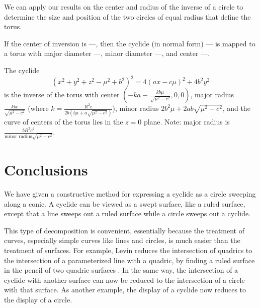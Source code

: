 {{We can apply our results on the center and radius of the inverse of a circle
to determine the size and position of the two circles of equal radius that
define the torus.

\begin{theorem}
\label{thm:twocircles}
If the center of inversion is ---, then the cyclide (in normal form) ---
is mapped to a torus with 
major diameter ---, 
minor diameter ---,
and center ---.
\end{theorem}



\begin{theorem}
The cyclide 
\[ 
(x^{2} + y^{2} + z^{2} - \mu^{2} + b^{2})^{2} = 4(ax - c\mu)^{2} + 4b^{2}y^{2}
\]
is the inverse of the torus
with center $(-ka-\frac{kb\mu}{\sqrt{\mu^{2} - c^{2}}},0,0)$,
major radius $\frac{kbc}{\sqrt{\mu^{2} - c^{2}}}$
(where $k = \frac{R^{2}c}{2b(b\mu + a\sqrt{\mu^{2} - c^{2}})}$),
minor radius $2b^{2}\mu + 2ab\sqrt{\mu^{2} - c^{2}}$,
and the curve of centers of the torus lies in the $z = 0$ plane.
Note: major radius is $\frac{bR^{2}c^{2}}
			    {\mbox{minor radius}\sqrt{\mu^{2}-c^{2}}}$.
\end{theorem}
}





\section{Conclusions}
\label{sec-con}

We have given a constructive method for expressing a cyclide
as a circle sweeping along a conic.
A cyclide can be viewed as a swept surface,
like a ruled surface, except that a line sweeps out a ruled surface
while a circle sweeps out a cyclide.

This type of decomposition is convenient, essentially because 
the treatment of curves, especially simple curves like lines and circles,
is much easier than the treatment of surfaces.
For example, Levin reduces the intersection of quadrics to the intersection
of a parameterized line with a quadric, 
by finding a ruled surface in the pencil of two quadric surfaces \cite{LEVI76}.
In the same way, the intersection of a cyclide
with another surface can now be reduced 
to the intersection of a circle with that surface.
As another example, the display of a cyclide now reduces to the 
display of a circle.

}
